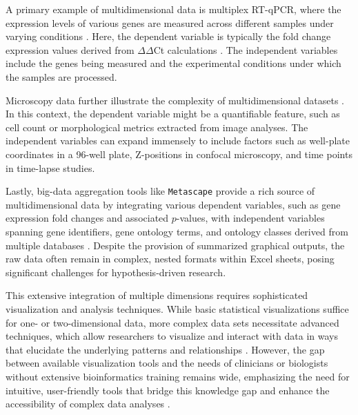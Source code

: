 A primary example of multidimensional data is multiplex RT-qPCR, where the
expression levels of various genes are measured across different samples under
varying conditions \cite{bustinReproducibilityBiomedicalResearch2014}. Here, the
dependent variable is typically the fold change expression values derived from
$\Delta\Delta$Ct calculations
\cite{brankatschkSimpleAbsoluteQuantification2012}. The independent variables
include the genes being measured and the experimental conditions under which the
samples are processed.

Microscopy data further illustrate the complexity of multidimensional datasets
\cite{ruedenImageJ2ImageJNext2017}. In this context, the dependent variable
might be a quantifiable feature, such as cell count or morphological metrics
extracted from image analyses. The independent variables can expand immensely to
include factors such as well-plate coordinates in a 96-well plate, Z-positions
in confocal microscopy, and time points in time-lapse studies.

Lastly, big-data aggregation tools like \texttt{Metascape} provide a rich source
of multidimensional data by integrating various dependent variables, such as
gene expression fold changes and associated $p$-values, with independent variables
spanning gene identifiers, gene ontology terms, and ontology classes derived from
multiple databases \cite{zhouMetascapeProvidesBiologistoriented2019}. Despite
the provision of summarized graphical outputs, the raw data often remain in
complex, nested formats within Excel sheets, posing significant challenges for
hypothesis-driven research.

This extensive integration of multiple dimensions requires sophisticated
visualization and analysis techniques. While basic statistical visualizations
suffice for one- or two-dimensional data, more complex data sets necessitate
advanced techniques, which allow researchers to visualize and interact with data
in ways that elucidate the underlying patterns and relationships
\cite{dunnExploringVisualizingMultidimensional2017}. However, the gap between
available visualization tools and the needs of clinicians or biologists without
extensive bioinformatics training remains wide, emphasizing the need for
intuitive, user-friendly tools that bridge this knowledge gap and enhance the
accessibility of complex data analyses
\cite{dunnExploringVisualizingMultidimensional2017}.





